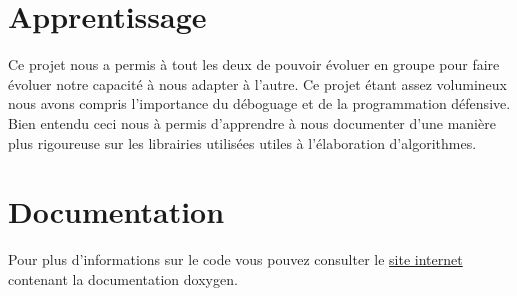 \documentclass[a4paper, 11pt, oneside]{article}
\begin{document}
\section{Apprentissage}
Ce projet nous a permis à tout les deux de pouvoir évoluer en groupe pour faire évoluer notre capacité à nous adapter à l'autre.
Ce projet étant assez volumineux nous avons compris l'importance du déboguage et de la programmation défensive.
Bien entendu ceci nous à permis d'apprendre à nous documenter d'une manière plus rigoureuse sur les librairies utilisées utiles à l'élaboration d'algorithmes.

\section{Documentation}
	Pour plus d'informations sur le code vous pouvez consulter le \href{html/index.html}{site internet} contenant la documentation doxygen.
\end{document}
